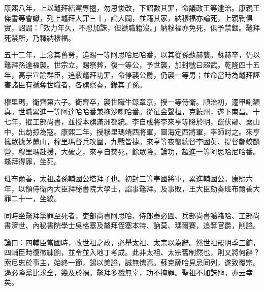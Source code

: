 \begin{pinyinscope}
康熙八年，上以鼇拜結黨專擅，勿思悛改，下詔數其罪，命議政王等逮治。康親王傑書等會讞，列上鼇拜大罪三十，論大闢，並籍其家，納穆福亦論死，上親鞫俱實，詔謂：「效力年久，不忍加誅，但褫職籍沒。」納穆福亦免死，俱予禁錮。鼇拜死禁所，乃釋納穆福。

五十二年，上念其舊勞，追賜一等阿思哈尼哈番，以其從孫蘇赫襲。蘇赫卒，仍以鼇拜孫達福襲。世宗立，賜祭葬，復一等公，予世襲，加封號曰超武。乾隆四十五年，高宗宣諭群臣，追覈鼇拜功罪，命停襲公爵，仍襲一等男；並命當時為鼇拜誣害諸臣有褫奪世職者，各旗察奏，錄其子孫。

穆里瑪，衛齊第六子。衛齊卒，襲世職牛錄章京，授一等侍衛。順治初，遷甲喇額真。世職累進一等阿達哈哈番兼拖沙喇哈番。從征金聲桓，克饒州，遂下南昌。十七年，擢工部尚書，並授本旗滿洲都統。李自成將李來亨等降於明，竄伏鄖、襄山中，出劫掠為寇。康熙二年，授穆里瑪靖西將軍，圖海定西將軍，率師討之。來亨擁眾據茅麓山，穆里瑪督兵攻圍，九戰皆捷。來亨等夜襲總督李國英、提督鄭蛟麟營，穆里瑪赴援，大破之，來亨自焚死，餘眾降。論功，超進一等阿思哈尼哈番。鼇拜得罪，坐死。

班布爾善，太祖諸孫輔國公塔拜子也。初封三等奉國將軍，累進輔國公。康熙六年，以領侍衛內大臣拜秘書院大學士，諂事鼇拜。及事敗，王大臣劾奏班布爾善大罪二十一，坐絞。

同時坐鼇拜黨罪至死者，吏部尚書阿思哈、侍郎泰必圖、兵部尚書噶褚哈、工部尚書濟世、內秘書院學士吳格塞及鼇拜侄塞本特、訥莫、瑪爾賽，追奪官爵，削謚。

論曰：四輔臣當國時，改世祖之政，必舉太祖、太宗以為辭。然世祖罷明季三餉，四輔臣時復徵練餉，並令並入地丁考成。此非太祖、太宗舊制然也，則又將何辭？索尼忠於事主，始終一節，錫以美謚，誠無愧焉。蘇克薩哈見忌同列，遂致覆宗。遏必隆黨比求全，幾及於禍。鼇拜多戮無辜，功不掩罪。聖祖不加誅殛，亦云幸矣。


\end{pinyinscope}